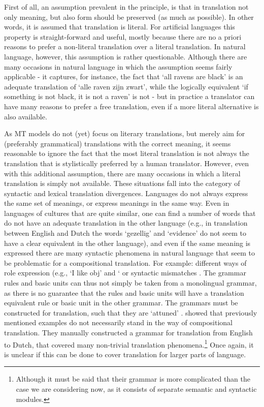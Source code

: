 First of all, an assumption prevalent in the principle, is that in translation not only meaning, but also form should be preserved (as much as possible). In other words, it is assumed that translation is literal. For artificial languages this property is straight-forward and useful, mostly because there are no a priori reasons to prefer a non-literal translation over a literal translation. In natural language, however, this assumption is rather questionable. Although there are many occasions in natural language in which the assumption seems fairly applicable - it captures, for instance, the fact that `all ravens are black' is an adequate translation of `alle raven zijn zwart', while the logically equivalent `if something is not black, it is not a raven' is not \citep{landsbergen1989power} - but in practice a translator can have many reasons to prefer a free translation, even if a more literal alternative is also available. 

As MT models do not (yet) focus on literary translations, but merely aim for (preferably grammatical) translations with the correct meaning, it seems reasonable to ignore the fact that the most literal translation is not always the translation that is stylistically preferred by a human translator. However, even with this additional assumption, there are many occasions in which a literal translation is simply not available. These situations fall into the category of  syntactic and lexical translation divergences. Languages do not always express the same set of meanings, or express meanings in the same way. Even in languages of cultures that are quite similar, one can find a number of words that do not have an adequate translation in the other language (e.g., in translation between English and Dutch the words `gezellig' and `evidence' do not seem to have a clear equivalent in the other language), and even if the same meaning is expressed there are many syntactic phenomena in natural language that seem to be problematic for a compositional translation. For example: different ways of role expression (e.g., `I like obj' and ` or syntactic mismatches \citep[e.g., `woonachtig zijn' and its translation `reside',][]{landsbergen1989power}. The grammar rules and basic units can thus not simply be taken from a monolingual grammar, as there is no guarantee that the rules and basic units will have a translation equivalent rule or basic unit in the other grammar. The grammars must be constructed for translation, such that they are `attuned' \citep{rosetta1994compositional}. \cite{rosetta1994compositional} showed that previously mentioned examples do not necessarily stand in the way of compositional translation. They manually constructed a grammar for translation from English to Dutch, that covered many non-trivial translation phenomena.\footnote{Although it must be said that their grammar is more complicated than the case we are considering now, as it consists of separate semantic and syntactic modules.} Once again, it is unclear if this can be done to cover translation for larger parts of language.
 
